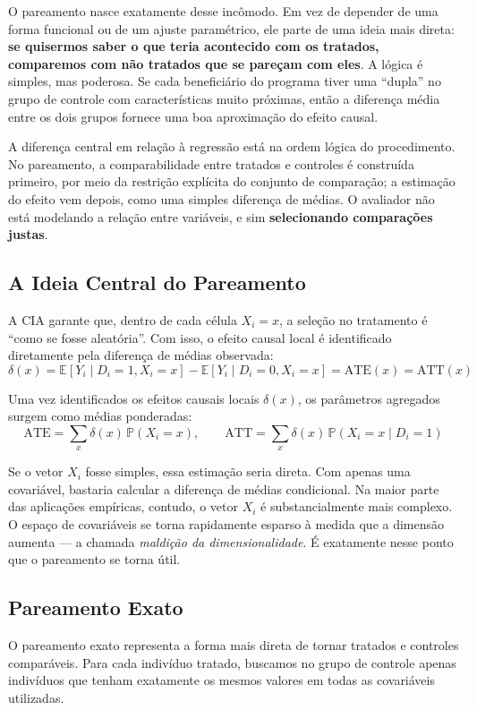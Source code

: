 \documentclass[12pt,a4paper]{article}
\begin{document}
O pareamento nasce exatamente desse incômodo. Em vez de depender de uma forma funcional ou de um ajuste paramétrico, ele parte de uma ideia mais direta: \textbf{se quisermos saber o que teria acontecido com os tratados, comparemos com não tratados que se pareçam com eles}. A lógica é simples, mas poderosa. Se cada beneficiário do programa tiver uma ``dupla'' no grupo de controle com características muito próximas, então a diferença média entre os dois grupos fornece uma boa aproximação do efeito causal.

A diferença central em relação à regressão está na ordem lógica do procedimento. No pareamento, a comparabilidade entre tratados e controles é construída primeiro, por meio da restrição explícita do conjunto de comparação; a estimação do efeito vem depois, como uma simples diferença de médias. O avaliador não está modelando a relação entre variáveis, e sim \textbf{selecionando comparações justas}.

\subsection{A Ideia Central do Pareamento}

A CIA garante que, dentro de cada célula $X_i = x$, a seleção no tratamento é ``como se fosse aleatória''. Com isso, o efeito causal local é identificado diretamente pela diferença de médias observada:
\[
\delta(x)
=
\mathbb{E}[Y_i \mid D_i = 1, X_i = x]
-
\mathbb{E}[Y_i \mid D_i = 0, X_i = x]
=
\text{ATE}(x)
=
\text{ATT}(x)
\]

Uma vez identificados os efeitos causais locais $\delta(x)$, os parâmetros agregados surgem como médias ponderadas:
\[
\text{ATE}
=
\sum_x \delta(x)\,\mathbb{P}(X_i = x),
\qquad
\text{ATT}
=
\sum_x \delta(x)\,\mathbb{P}(X_i = x \mid D_i = 1)
\]

Se o vetor $X_i$ fosse simples, essa estimação seria direta. Com apenas uma covariável, bastaria calcular a diferença de médias condicional. Na maior parte das aplicações empíricas, contudo, o vetor $X_i$ é substancialmente mais complexo. O espaço de covariáveis se torna rapidamente esparso à medida que a dimensão aumenta --- a chamada \textit{maldição da dimensionalidade}. É exatamente nesse ponto que o pareamento se torna útil.

\subsection{Pareamento Exato}

O pareamento exato representa a forma mais direta de tornar tratados e controles comparáveis. Para cada indivíduo tratado, buscamos no grupo de controle apenas indivíduos que tenham exatamente os mesmos valores em todas as covariáveis utilizadas.
\end{document}

